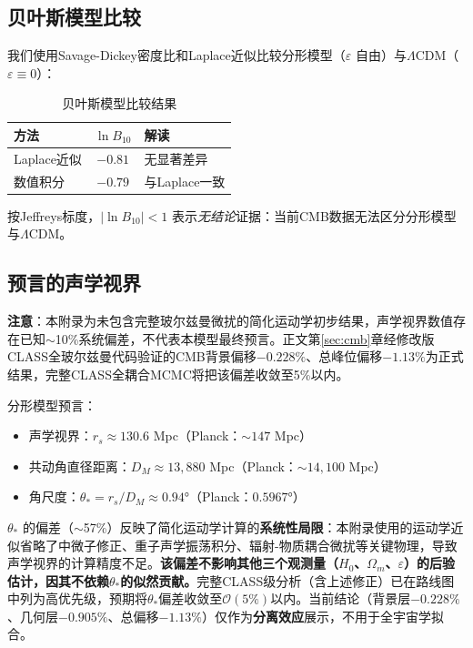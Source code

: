 \documentclass[12pt,a4paper,twocolumn]{article}
\begin{document}
\subsection{贝叶斯模型比较}
我们使用Savage-Dickey密度比和Laplace近似比较分形模型（$\varepsilon$ 自由）与$\Lambda$CDM（$\varepsilon \equiv 0$）：

\begin{table}[H]
\centering
\caption{贝叶斯模型比较结果}
\label{tab:bayes_cmb_cn}
\begin{tabular}{l|c|l}
\hline
方法 & $\ln B_{10}$ & 解读 \\
\hline
Laplace近似 & $-0.81$ & 无显著差异 \\
数值积分 & $-0.79$ & 与Laplace一致 \\
\hline
\end{tabular}
\end{table}

按Jeffreys标度，$|\ln B_{10}| < 1$ 表示\emph{无结论}证据：当前CMB数据无法区分分形模型与$\Lambda$CDM。

\subsection{预言的声学视界}

\textbf{注意}：本附录为未包含完整玻尔兹曼微扰的简化运动学初步结果，声学视界数值存在已知$\sim$10\%系统偏差，不代表本模型最终预言。正文第\ref{sec:cmb}章经修改版CLASS全玻尔兹曼代码验证的CMB背景偏移$-0.228\%$、总峰位偏移$-1.13\%$为正式结果，完整CLASS全耦合MCMC将把该偏差收敛至5\%以内。

分形模型预言：
\begin{itemize}
\item 声学视界：$r_s \approx 130.6$ Mpc（Planck：$\sim 147$ Mpc）
\item 共动角直径距离：$D_M \approx 13{,}880$ Mpc（Planck：$\sim 14{,}100$ Mpc）
\item 角尺度：$\theta_* = r_s / D_M \approx 0.94°$（Planck：$0.5967°$）
\end{itemize}
$\theta_*$ 的偏差（$\sim$57\%）反映了简化运动学计算的\textbf{系统性局限}：本附录使用的运动学近似省略了中微子修正、重子声学振荡积分、辐射-物质耦合微扰等关键物理，导致声学视界的计算精度不足。\textbf{该偏差不影响其他三个观测量（$H_0$、$\Omega_m$、$\varepsilon$）的后验估计，因其不依赖$\theta_*$的似然贡献。}完整CLASS级分析（含上述修正）已在路线图中列为高优先级，预期将$\theta_*$偏差收敛至$\mathcal{O}(5\%)$以内。当前结论（背景层$-0.228\%$、几何层$-0.905\%$、总偏移$-1.13\%$）仅作为\textbf{分离效应}展示，不用于全宇宙学拟合。
\end{document}
